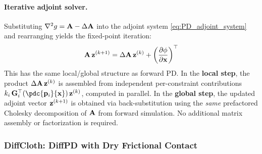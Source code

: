 \paragraph{Iterative adjoint solver.} Substituting $\nabla^2 g = \mathbf{A} - \Delta\mathbf{A}$ into the adjoint system \eqref{eq:PD_adjoint_system} and rearranging yields the fixed-point iteration:
\begin{equation}\label{eq:diffpd_iteration}
    \mathbf{A}\,\mathbf{z}^{(k+1)} = \Delta\mathbf{A}\,\mathbf{z}^{(k)} + \left(\frac{\partial \phi}{\partial \mathbf{x}}\right)^\top
\end{equation}
This has the same local/global structure as forward PD. In the \textbf{local step}, the product $\Delta\mathbf{A}\,\mathbf{z}^{(k)}$ is assembled from independent per-constraint contributions $k_i\,\G_i^\top(\pdc{\p_i}{\x})\,\z^{(k)}$, computed in parallel. In the \textbf{global step}, the updated adjoint vector $\mathbf{z}^{(k+1)}$ is obtained via back-substitution using the \emph{same} prefactored Cholesky decomposition of $\mathbf{A}$ from forward simulation. No additional matrix assembly or factorization is required.


\subsubsection{DiffCloth: DiffPD with Dry Frictional Contact \cite{li2022diffcloth}}

